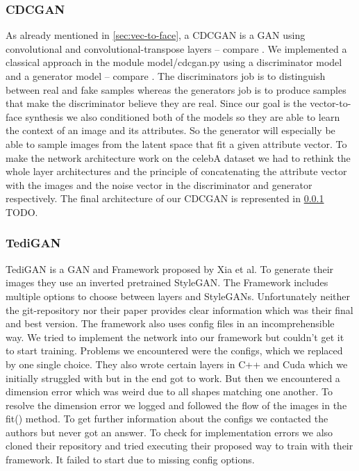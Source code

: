 \documentclass[12pt, a4paper]{article}
\begin{document}
\subsubsection{CDCGAN}
As already mentioned in \ref{sec:vec-to-face}, a CDCGAN is a GAN using convolutional and convolutional-transpose layers
-- compare \cite{dcgan}.
We implemented a classical approach in the module model/cdcgan.py using a discriminator model and a generator model --
compare \cite{gan}.
The discriminators job is to distinguish between real and fake samples whereas the generators job is to produce samples
that make the discriminator believe they are real.
Since our goal is the vector-to-face synthesis we also conditioned both of the models so they are able to learn the
context of an image and its attributes.
So the generator will especially be able to sample images from the latent space that fit a given attribute vector.
To make the network architecture work on the celebA dataset we had to rethink the whole layer architectures and the
principle of concatenating the attribute vector with the images and the noise vector in the discriminator and generator
respectively.
The final architecture of our CDCGAN is represented in \ref{} TODO.

\subsubsection{TediGAN}
\label{sec:tedi}
TediGAN is a GAN and Framework proposed by Xia et al. To generate their images they use an inverted pretrained StyleGAN. The Framework includes multiple options to choose between layers and StyleGANs. 
Unfortunately neither the git-repository nor their paper provides clear information which was their final and best version. The framework also uses config files in an incomprehensible way. We tried to 
implement the network into our framework but couldn't get it to start training. Problems we encountered were the configs, which we replaced by one single choice. They also wrote certain layers in C++ and 
Cuda which we initially struggled with but in the end got to work. But then we encountered a dimension error which was weird due to all shapes matching one another. To resolve the dimension error we 
logged and followed the flow of the images in the fit() method. To get further information about the configs we contacted the authors but never got an answer.
To check for implementation errors we also cloned their repository and tried executing their proposed way to train with their framework. It failed to start due to missing config options.
\end{document}
